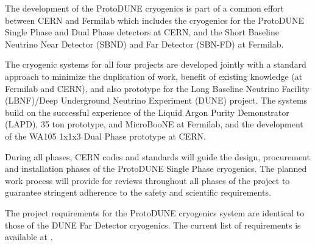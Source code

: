 The development of the ProtoDUNE cryogenics is part of a common effort between CERN and Fermilab which includes the cryogenics for the ProtoDUNE Single Phase and Dual Phase detectors at CERN, and the Short Baseline Neutrino Near Detector (SBND) and Far Detector (SBN-FD) at Fermilab.

The cryogenic systems for all four projects are developed jointly with a standard approach to minimize the duplication of work, benefit of existing knowledge (at Fermilab and CERN), and also prototype for the Long Baseline Neutrino Facility (LBNF)/Deep Underground Neutrino Experiment (DUNE) project. The systems build on the successful experience of the Liquid Argon Purity Demonstrator (LAPD), 35 ton prototype, and MicroBooNE at Fermilab, and the development of the WA105 1x1x3 Dual Phase prototype at CERN.


During all phases, CERN codes and standards will guide the design, procurement and installation phases of the ProtoDUNE Single Phase cryogenics. The planned work process will provide for reviews throughout all phases of the project to guarantee stringent adherence to the safety and scientific requirements.




The project requirements for the ProtoDUNE cryogenics system are identical to those of the DUNE Far Detector cryogenics. The current list 
of requirements is available at \cite{DUNE_FD_cryogenics_req}. 

